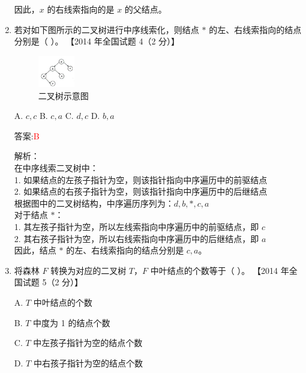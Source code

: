 \documentclass[lang=cn,newtx,10pt,scheme=chinese]{../../../elegantbook}
\begin{document}
\begin{enumerate}
        因此，$x$ 的右线索指向的是 $x$ 的父结点。\\
    
        \item 若对如下图所示的二叉树进行中序线索化，则结点 $*$ 的左、右线索指向的结点分别是（ ）。  
        【2014 年全国试题 4（2 分）】
        \begin{figure}[h!]
                \centering
                \includegraphics[width=0.15\textwidth]{../../figure/exercisePicPDF/chapter6/6-20.pdf}
                \caption{二叉树示意图}
        \end{figure}
    
        A. $c, c$ \quad B. $c, a$ \quad C. $d, c$ \quad D. $b, a$  
    
        答案:\textcolor{red}{B}
        
        解析：\\
        在中序线索二叉树中：\\
        1. 如果结点的左孩子指针为空，则该指针指向中序遍历中的前驱结点\\
        2. 如果结点的右孩子指针为空，则该指针指向中序遍历中的后继结点\\
        
        根据图中的二叉树结构，中序遍历序列为：$d, b, *, c, a$\\
        
        对于结点 $*$：\\
        1. 其左孩子指针为空，所以左线索指向中序遍历中的前驱结点，即 $c$\\
        2. 其右孩子指针为空，所以右线索指向中序遍历中的后继结点，即 $a$\\
        
        因此，结点 $*$ 的左、右线索指向的结点分别是 $c, a$。\\
    
        \item 将森林 $F$ 转换为对应的二叉树 $T$，$F$ 中叶结点的个数等于（ ）。  
        【2014 年全国试题 5（2 分）】  
    
        A. $T$ 中叶结点的个数  
    
        B. $T$ 中度为 1 的结点个数  
    
        C. $T$ 中左孩子指针为空的结点个数  
    
        D. $T$ 中右孩子指针为空的结点个数  
    

\end{enumerate}
\end{document}
